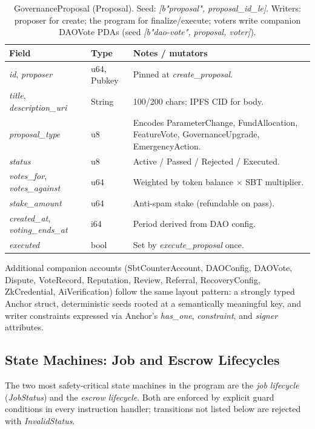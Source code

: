 \begin{table}[H]
\centering
\caption{GovernanceProposal (Proposal). Seed: \emph{[b"proposal", proposal\_id\_le]}. Writers: proposer for create; the program for finalize/execute; voters write companion DAOVote PDAs (seed \emph{[b"dao-vote", proposal, voter]}).}
\label{table:pda_proposal}
\small
\begin{tabular}{|l|l|p{6.5cm}|}
\hline
\textbf{Field} & \textbf{Type} & \textbf{Notes / mutators} \\ \hline
\emph{id}, \emph{proposer} & u64, Pubkey & Pinned at \emph{create\_proposal}. \\ \hline
\emph{title}, \emph{description\_uri} & String & 100/200 chars; IPFS CID for body. \\ \hline
\emph{proposal\_type} & u8 & Encodes ParameterChange, FundAllocation, FeatureVote, GovernanceUpgrade, EmergencyAction. \\ \hline
\emph{status} & u8 & Active / Passed / Rejected / Executed. \\ \hline
\emph{votes\_for}, \emph{votes\_against} & u64 & Weighted by token balance $\times$ SBT multiplier. \\ \hline
\emph{stake\_amount} & u64 & Anti-spam stake (refundable on pass). \\ \hline
\emph{created\_at}, \emph{voting\_ends\_at} & i64 & Period derived from DAO config. \\ \hline
\emph{executed} & bool & Set by \emph{execute\_proposal} once. \\ \hline
\end{tabular}
\end{table}

\noindent Additional companion accounts (SbtCounterAccount, DAOConfig, DAOVote, Dispute, VoteRecord, Reputation, Review, Referral, RecoveryConfig, ZkCredential, AiVerification) follow the same layout pattern: a strongly typed Anchor struct, deterministic seeds rooted at a semantically meaningful key, and writer constraints expressed via Anchor's \emph{has\_one}, \emph{constraint}, and \emph{signer} attributes.

\subsection{State Machines: Job and Escrow Lifecycles}
\label{subsection:4.2.3}

The two most safety-critical state machines in the program are the \emph{job lifecycle} (\emph{JobStatus}) and the \emph{escrow lifecycle}. Both are enforced by explicit guard conditions in every instruction handler; transitions not listed below are rejected with \emph{InvalidStatus}.

